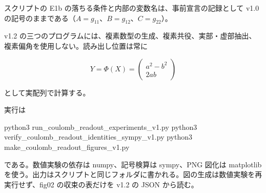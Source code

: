 \documentclass[
  a4paper,
]{ltjsarticle}
\newenvironment{Shaded}{}{}
\newcommand{\NormalTok}[1]{#1}
\begin{document}
スクリプトの E1b の落ちる条件と内部の変数名は、事前宣言の記録として v1.0
の記号のままである（\(A=g_{11}\)、\(B=g_{12}\)、\(C=g_{22}\)）。

v1.2
の三つのプログラムには、複素数型の生成、複素共役、実部・虚部抽出、複素偏角を使用しない。読み出し位置は常に

\[
Y=\Phi(X)=\begin{pmatrix}a^2-b^2\\2ab\end{pmatrix}
\]

として実配列で計算する。

実行は

\begin{Shaded}
\begin{Highlighting}[]
\NormalTok{python3 run\_coulomb\_readout\_experiments\_v1.py}
\NormalTok{python3 verify\_coulomb\_readout\_identities\_sympy\_v1.py}
\NormalTok{python3 make\_coulomb\_readout\_figures\_v1.py}
\end{Highlighting}
\end{Shaded}

である。数値実験の依存は numpy、記号検算は sympy、PNG 図化は matplotlib
を使う。出力はスクリプトと同じフォルダに書かれる。図の生成は数値実験を再実行せず、fig02
の収束の表だけを v1.2 の JSON から読む。
\end{document}
